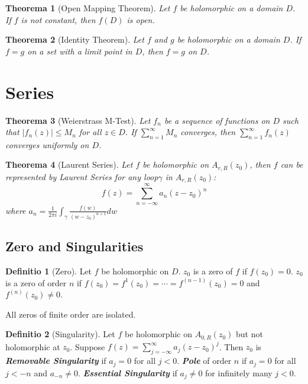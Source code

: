 \documentclass[12pt, a4paper]{article}
\newtheorem{theorem}{Theorema}[section]
\theoremstyle{definition}
\newtheorem{definition}{Definitio}[section]
\theoremstyle{remark}
\renewcommand{\emph}[1]{\textbf{\textit{#1}}}
\begin{document}
\begin{theorem}[Open Mapping Theorem]
	Let $f$ be holomorphic on a domain $D$. If $f$ is not constant, then $f(D)$ is open.
\end{theorem}

\begin{theorem}[Identity Theorem]
	Let $f$ and $g$ be holomorphic on a domain $D$. If $f = g$ on a set with a limit point in $D$, then $f = g$ on $D$.
\end{theorem}

\section{Series}

\begin{theorem}[Weierstrass M-Test]
	Let $f_n$ be a sequence of functions on $D$ such that $|f_n(z)| \leq M_n$ for all $z \in D$. If $\sum_{n=1}^{\infty} M_n$ converges, then $\sum_{n=1}^{\infty} f_n(z)$ converges uniformly on $D$.
\end{theorem}


\begin{theorem}[Laurent Series]
	Let $f$ be holomorphic on $A_{r,R}(z_0)$, then $f$ can be represented by Laurent Series for any loop$\gamma$ in $A_{r,R}(z_0)$:
	$$
	f(z) = \sum_{n=-\infty}^{\infty} a_n (z - z_0)^n
	$$
	where $a_n = \frac{1}{2\pi i} \int_{\gamma} \frac{f(w)}{(w - z_0)^{n+1}} dw$
\end{theorem}

\subsection{Zero and Singularities}
\begin{definition}[Zero]
	Let $f$ be holomorphic on $D$. $z_0$ is a zero of $f$ if $f(z_0) = 0$. $z_0$ is a zero of order $n$ if $f(z_0) = f^{1}(z_0) = \cdots = f^{(n-1)}(z_0) = 0$ and $f^{(n)}(z_0) \neq 0$.
\end{definition}

All zeros of finite order are isolated.

\begin{definition}[Singularity]
	Let $f$ be holomorphic on $A_{0,R} (z_0)$ but not holomorphic at $z_0$. Suppose $f(z) = \sum^{\infty}_{j = - \infty} a_j(z-z_0)^j$. Then $z_0$ is 
	\emph{Removable Singularity} if $a_j = 0$ for all $j < 0$. 
	\emph{Pole} of order $n$ if $a_j = 0$ for all $j < -n$ and $a_{-n} \neq 0$.
	\emph{Essential Singularity} if $a_j \neq 0$ for infinitely many $j < 0$.
\end{definition}
\end{document}
